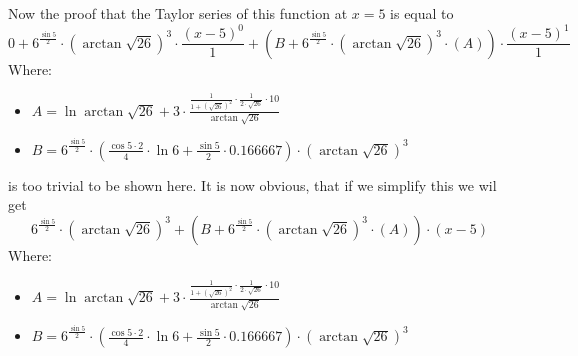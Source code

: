 \documentclass{article}
\begin{document}
Now the proof that the Taylor series of this function at $x = 5$ is equal to
\begin{equation}
0 + 6 ^{\frac{\sin 5 }{2 } } \cdot \left( \arctan \sqrt {26 } \right) ^{3 } \cdot \frac{\left( x - 5 \right) ^{0 } }{1 } + \left( B + 6 ^{\frac{\sin 5 }{2 } } \cdot \left( \arctan \sqrt {26 } \right) ^{3 } \cdot \left( A \right) \right) \cdot \frac{\left( x - 5 \right) ^{1 } }{1 } 
\end{equation}
Where:
\begin{itemize}
	\item $A = \ln \arctan \sqrt {26 } + 3 \cdot \frac{\frac{1 }{1 + \left( \sqrt {26 } \right) ^{2 } } \cdot \frac{1 }{2 \cdot \sqrt {26 } } \cdot 10 }{\arctan \sqrt {26 } } $
	\item $B = 6 ^{\frac{\sin 5 }{2 } } \cdot \left( \frac{\cos 5 \cdot 2 }{4 } \cdot \ln 6 + \frac{\sin 5 }{2 } \cdot 0.166667 \right) \cdot \left( \arctan \sqrt {26 } \right) ^{3 } $
\end{itemize}

is too trivial to be shown here.
It is now obvious, that if we simplify this we wil get
\begin{equation}
6 ^{\frac{\sin 5 }{2 } } \cdot \left( \arctan \sqrt {26 } \right) ^{3 } + \left( B + 6 ^{\frac{\sin 5 }{2 } } \cdot \left( \arctan \sqrt {26 } \right) ^{3 } \cdot \left( A \right) \right) \cdot \left( x - 5 \right) 
\end{equation}
Where:
\begin{itemize}
	\item $A = \ln \arctan \sqrt {26 } + 3 \cdot \frac{\frac{1 }{1 + \left( \sqrt {26 } \right) ^{2 } } \cdot \frac{1 }{2 \cdot \sqrt {26 } } \cdot 10 }{\arctan \sqrt {26 } } $
	\item $B = 6 ^{\frac{\sin 5 }{2 } } \cdot \left( \frac{\cos 5 \cdot 2 }{4 } \cdot \ln 6 + \frac{\sin 5 }{2 } \cdot 0.166667 \right) \cdot \left( \arctan \sqrt {26 } \right) ^{3 } $
\end{itemize}
\end{document}
